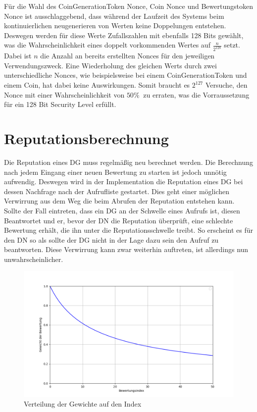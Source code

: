 \documentclass[
	fontsize=11pt,
	headings=small,
	parskip=half,           %
	bibliography=totoc,
	numbers=noenddot,       %
	open=any,               %
]{scrreprt}
\begin{document}
Für die Wahl des CoinGenerationToken Nonce, Coin Nonce und Bewertungstoken Nonce ist ausschlaggebend, dass während der Laufzeit des Systems beim kontinuierlichen neugenerieren von Werten keine Doppelungen entstehen. Deswegen werden für diese Werte Zufallszahlen mit ebenfalls 128 Bits gewählt, was die Wahrscheinlichkeit eines doppelt vorkommenden Wertes auf $\frac{n}{2^{128}}$ setzt. Dabei ist $n$ die Anzahl an bereits erstellten Nonces für den jeweiligen Verwendungszweck. Eine Wiederholung des gleichen Werts durch zwei unterschiedliche Nonces, wie beispielsweise bei einem CoinGenerationToken und einem Coin, hat dabei keine Auswirkungen. Somit braucht es $2^{127}$ Versuche, den Nonce mit einer Wahrscheinlichkeit von $50\%\ $ zu erraten, was die Vorraussetzung für ein 128 Bit Security Level erfüllt.

\section{Reputationsberechnung}
Die Reputation eines DG muss regelmäßig neu berechnet werden. Die Berechnung nach jedem Eingang einer neuen Bewertung zu starten ist jedoch unnötig aufwendig. Deswegen wird in der Implementation die Reputation eines DG bei dessen Nachfrage nach der Aufrufliste gestartet. Dies geht einer möglichen Verwirrung aus dem Weg die beim Abrufen der Reputation entstehen kann. Sollte der Fall eintreten, dass ein DG an der Schwelle eines Aufrufs ist, diesen Beantwortet und er, bevor der DN die Reputation überprüft, eine schlechte Bewertung erhält, die ihn unter die Reputationsschwelle treibt. So erscheint es für den DN so als sollte der DG nicht in der Lage dazu sein den Aufruf zu beantworten. Diese Verwirrung kann zwar weiterhin auftreten, ist allerdings nun unwahrscheinlicher.

\begin{figure}[H]
    \centering
    \caption{Verteilung der Gewichte auf den Index}
    \label{fig:reputationWeights}
    \includegraphics[width=0.8\linewidth]{ReputationWeights.png}
\end{figure}
\end{document}

